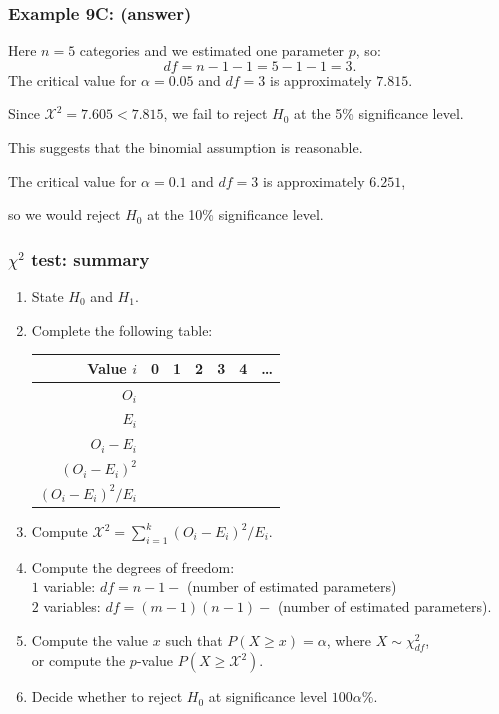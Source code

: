 \documentclass[t,8pt]{beamer}
\begin{document}
\begin{frame}
	\frametitle{Example 9C: (answer)}
	Here $n=5$ categories and we estimated one parameter $p$, so:
	\[
	df = n - 1 - 1 = 5-1-1=3.
	\]
	The critical value for \( \alpha = 0.05 \) and \( df = 3 \) is approximately $7.815$. \par
	Since \( \mathcal{X}^2 = 7.605 < 7.815 \), we fail to reject \( H_0 \) at the 5\% significance level. \par
	This suggests that the binomial assumption is reasonable. \par
	The critical value for \( \alpha = 0.1 \) and \( df = 3 \) is approximately $6.251$, \par
	so we would reject $H_0$ at the 10\% significance level.
\end{frame}

\begin{frame}
	\frametitle{$\chi^2$ test: summary}
	\begin{enumerate}
		\item State $H_0$ and $H_1$.
		\item Complete the following table:
		\begin{center}
			\begin{tabular}{ r || c | c | c | c | c | c |}
				Value $i$ & 0 & 1 & 2 & 3 & 4 & \dots\\ \hline
				$O_i$ &  &  &  &  &  &  \\ \hline
				$E_i$ &  &  &  &  &  &  \\ \hline
				$O_i-E_i$ &  &  &  &  &  &  \\ \hline
				$(O_i-E_i)^2$ &  &  &  &  &  &  \\ \hline
				$(O_i-E_i)^2/E_i$ &  &  &  &  &  &  \\ \hline
			\end{tabular}
		\end{center}
		\item Compute $\mathcal{X}^2=\sum_{i=1}^k(O_i-E_i)^2/E_i$.
		\item Compute the degrees of freedom: \\
		$1$ variable: $df = n - 1 -$ (number of estimated parameters) \\
		$2$ variables: $df = (m-1)(n-1) -$ (number of estimated parameters).
		\item Compute the value $x$ such that $P(X\geq x)=\alpha$, where $X\sim\chi^2_{df}$, \\
		or compute the $p$-value $P(X\geq \mathcal{X}^2)$.
		\item Decide whether to reject $H_0$ at significance level $100\alpha\%$.
	\end{enumerate}
\end{frame}
\end{document}
